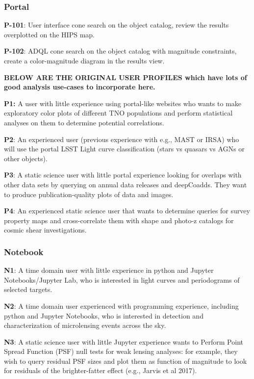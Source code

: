 
\subsubsection{Portal}

\textbf{P-101}: User interface cone search on the object catalog, review the results overplotted on the HIPS map.

\textbf{P-102}: ADQL cone search on the object catalog with magnitude constraints, create a color-magnitude diagram in the results view.


\textbf{BELOW ARE THE ORIGINAL USER PROFILES which have lots of good analysis use-cases to incorporate here.}

\textbf{P1:} A user with little experience using portal-like websites who wants to make exploratory color plots of different TNO populations and perform statistical analyses on them to determine potential correlations. 

\textbf{P2}: An experienced user (previous experience with e.g., MAST or IRSA) who will use the portal  LSST Light curve classification (stars vs quasars vs AGNs or other objects). 

\textbf{P3}: A static science user with little portal experience looking for overlaps with other data sets by querying on annual data releases and deepCoadds. They want to produce publication-quality plots of data and images. 

\textbf{P4}: An experienced static science user that wants to determine queries for survey property maps and cross-correlate them with shape and photo-z catalogs for cosmic shear investigations. 

\subsubsection{Notebook}

\textbf{N1}: A time domain user with little experience in python and Jupyter Notebooks/Jupyter Lab, who is interested in light curves and periodograms of selected targets. 

\textbf{N2}:   A time domain user experienced with programming experience, including python and Jupyter Notebooks, who is interested in detection and characterization of microlensing events across the sky.

\textbf{N3}:   A static science user with little Jupyter experience wants to Perform Point Spread Function (PSF) null tests for weak lensing analyses: for example, they wish to query residual PSF sizes and plot them as function of magnitude to look for residuals of the brighter-fatter effect (e.g., Jarvis et al 2017).

